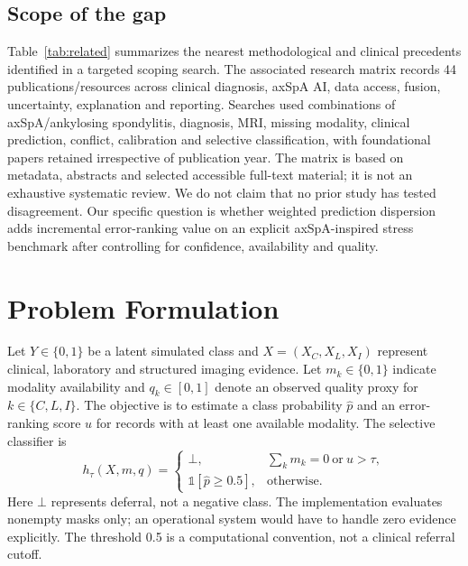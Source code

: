\documentclass[conference]{IEEEtran}
\begin{document}
\subsection{Scope of the gap}
Table~\ref{tab:related} summarizes the nearest methodological and clinical precedents identified in a targeted scoping search. The associated research matrix records 44 publications/resources across clinical diagnosis, axSpA AI, data access, fusion, uncertainty, explanation and reporting. Searches used combinations of axSpA/ankylosing spondylitis, diagnosis, MRI, missing modality, clinical prediction, conflict, calibration and selective classification, with foundational papers retained irrespective of publication year. The matrix is based on metadata, abstracts and selected accessible full-text material; it is not an exhaustive systematic review. We do not claim that no prior study has tested disagreement. Our specific question is whether weighted prediction dispersion adds incremental error-ranking value on an explicit axSpA-inspired stress benchmark after controlling for confidence, availability and quality.
\section{Problem Formulation}
Let $Y\in\{0,1\}$ be a latent simulated class and $X=(X_C,X_L,X_I)$ represent clinical, laboratory and structured imaging evidence. Let $m_k\in\{0,1\}$ indicate modality availability and $q_k\in[0,1]$ denote an observed quality proxy for $k\in\{C,L,I\}$. The objective is to estimate a class probability $\hat p$ and an error-ranking score $u$ for records with at least one available modality. The selective classifier is
\begin{equation}
 h_\tau(X,m,q)=\begin{cases}\bot,&\sum_km_k=0\ \text{or}\ u>\tau,\\\mathbb{1}[\hat p\geq 0.5],&\text{otherwise}.\end{cases}
\end{equation}
Here $\bot$ represents deferral, not a negative class. The implementation evaluates nonempty masks only; an operational system would have to handle zero evidence explicitly. The threshold 0.5 is a computational convention, not a clinical referral cutoff.
\end{document}
